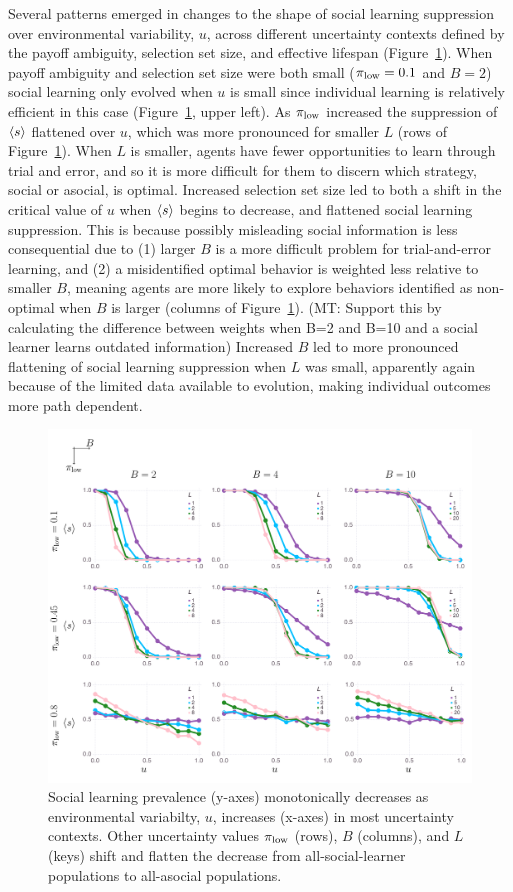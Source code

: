 \documentclass[letterpaper,11.5pt]{scrartcl}
\newcommand{\mt}[1]{{\textcolor{myorange} {({\tiny MT:} #1)}}}
\begin{document}
Several patterns emerged in changes to the shape of social learning suppression over
environmental variability, $u$, across different uncertainty contexts defined by the
payoff ambiguity, selection set size, and effective lifespan
(Figure~\ref{fig:mainResults}). When payoff ambiguity and selection set size were
both small ($\pi_{\mathrm{low}} = 0.1$ and $B=2$) social learning only evolved when $u$ is small
since individual learning is relatively efficient in this case
(Figure~\ref{fig:mainResults}, upper left). As $\pi_{\mathrm{low}}$ increased the suppression of
$\langle s \rangle$ flattened over $u$, which was more pronounced for smaller $L$ (rows of
Figure~\ref{fig:mainResults}).  When $L$ is smaller, agents have fewer opportunities
to learn through trial and error, and so it is more difficult for them to discern
which strategy, social or asocial, is optimal. Increased selection set size led to
both a shift in the critical value of $u$ when $\langle s \rangle$ begins to decrease, and
flattened social learning suppression. This is because possibly misleading 
social information is less consequential due
to (1) larger $B$ is a more difficult problem for trial-and-error learning, and
(2) a misidentified optimal behavior is weighted less relative to smaller
$B$, meaning agents are more likely to explore behaviors identified as non-optimal
when $B$ is larger (columns of Figure~\ref{fig:mainResults}).  \mt{Support this by calculating the difference between weights when B=2 and B=10 and a social learner learns outdated information}
Increased $B$ led to more pronounced flattening of social learning suppression when
$L$ was small, apparently again because of the limited data available to evolution,
making individual outcomes more path dependent.

\begin{figure}
  \caption{Social learning prevalence (y-axes) monotonically decreases as 
  environmental variabilty, $u$, increases (x-axes) in most uncertainty contexts. 
  Other uncertainty values $\pi_{\mathrm{low}}$ (rows), $B$ (columns), and $L$ (keys)
  shift and flatten the decrease from all-social-learner populations to all-asocial 
  populations.}
  \label{fig:mainResults}
  \centering
    \includegraphics[width=\textwidth]{Figures/mainResultsPlots.pdf}
\end{figure}
\end{document}
